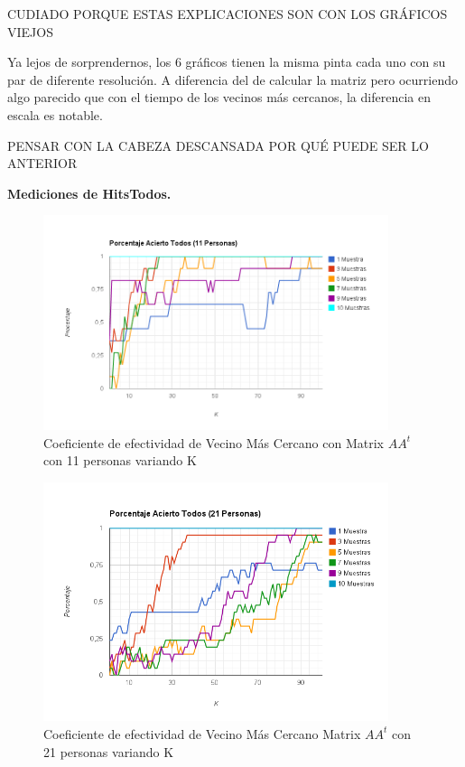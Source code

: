 CUDIADO PORQUE ESTAS EXPLICACIONES SON CON LOS GRÁFICOS VIEJOS

Ya lejos de sorprendernos, los 6 gráficos tienen la misma pinta cada uno con su par de diferente
resolución. A diferencia del de calcular la matriz pero ocurriendo algo parecido que con el tiempo
de los vecinos más cercanos, la diferencia en escala es notable.

PENSAR CON LA CABEZA DESCANSADA POR QUÉ PUEDE SER LO ANTERIOR

\textbf{Mediciones de HitsTodos. }

\begin{figure}[H]
\includegraphics[width=0.9\textwidth]{img/imagef10.png}
     \caption{Coeficiente de efectividad de Vecino Más Cercano con Matrix $AA^t$ con 11 personas variando K}
\end{figure}

\begin{figure}[H]
\includegraphics[width=0.9\textwidth]{img/imagef11.png}
     \caption{Coeficiente de efectividad de Vecino Más Cercano Matrix $AA^t$ con 21 personas variando K}
\end{figure}

